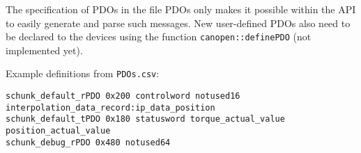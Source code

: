 The specification of PDOs in the file PDOs only makes it possible within the API to easily generate and parse such messages. New user-defined PDOs also need to be declared to the devices using the function \texttt{canopen::definePDO} (not implemented yet). 

Example definitions from \texttt{PDOs.csv}:
{\scriptsize
\begin{verbatim}
schunk_default_rPDO 0x200 controlword notused16 interpolation_data_record:ip_data_position
schunk_default_tPDO 0x180 statusword torque_actual_value position_actual_value
schunk_debug_rPDO 0x480 notused64
\end{verbatim}}
